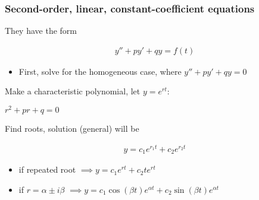 \documentclass[12pt]{article}
\begin{document}
\subsubsection*{Second-order, linear, constant-coefficient equations}
\label{sec:orgf20234e}
They have the form

\begin{align*}
	y'' + p y' + q y = f(t)
\end{align*}

\begin{itemize}
\item First, solve for the homogeneous case, where \(y'' + p y' + q y = 0\)
\end{itemize}

Make a characteristic polynomial, let \(y = e^{rt}\): 

\(r^2+pr+q=0\)

Find roots, solution (general) will be

\begin{align*}
	y = c_1 e^{r_1 t} + c_2 e^{r_2 t}
\end{align*}

\begin{itemize}
\item if repeated root \(\implies y = c_1 e^{rt} + c_2 t e^{rt}\)
\item if \(r = \alpha \pm i \beta\) \(\implies y=c_1 \cos(\beta t)e^{\alpha t} + c_2
  \sin(\beta t) e^{\alpha t}\)
\end{itemize}
\end{document}
